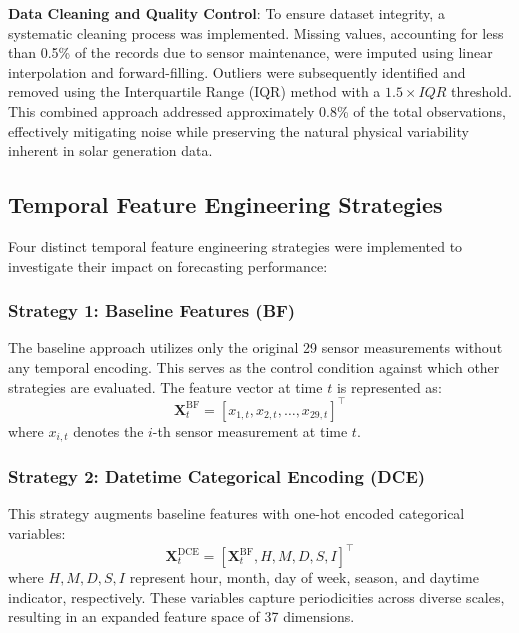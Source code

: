 \documentclass[conference]{IEEEtran}
\begin{document}
	\textbf{Data Cleaning and Quality Control}: To ensure dataset integrity, a systematic cleaning process was implemented. Missing values, accounting for less than 0.5\% of the records due to sensor maintenance, were imputed using linear interpolation and forward-filling. Outliers were subsequently identified and removed using the Interquartile Range (IQR) method with a $1.5 \times IQR$ threshold. This combined approach addressed approximately 0.8\% of the total observations, effectively mitigating noise while preserving the natural physical variability inherent in solar generation data.
	
	\subsection{Temporal Feature Engineering Strategies}
	Four distinct temporal feature engineering strategies were implemented to investigate their impact on forecasting performance:
	
	\subsubsection{Strategy 1: Baseline Features (BF)}
	The baseline approach utilizes only the original 29 sensor measurements without any temporal encoding. This serves as the control condition against which other strategies are evaluated. The feature vector at time $t$ is represented as:
	\begin{equation*}
		\mathbf{X}_t^{\text{BF}} = [x_{1,t}, x_{2,t}, \ldots, x_{29,t}]^\top
	\end{equation*}
	where $x_{i,t}$ denotes the $i$-th sensor measurement at time $t$.
	
	\subsubsection{Strategy 2: Datetime Categorical Encoding (DCE)}
	This strategy augments baseline features with one-hot encoded categorical variables:
	\begin{equation*}
		\mathbf{X}_t^{\text{DCE}} = [\mathbf{X}_t^{\text{BF}}, H, M, D, S, I]^\top
	\end{equation*}
	where $H, M, D, S, I$ represent hour, month, day of week, season, and daytime indicator, respectively. These variables capture periodicities across diverse scales, resulting in an expanded feature space of 37 dimensions.
	
\end{document}
